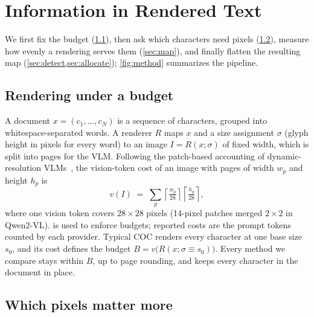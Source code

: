 

\section{Information in Rendered Text}
\label{sec:method}

We first fix the budget (\cref{sec:formulation}), then ask which characters need pixels (\cref{sec:principle}), measure how evenly a rendering serves them (\cref{sec:map}), and finally flatten the resulting map (\cref{sec:detect,sec:allocate}); \cref{fig:method} summarizes the pipeline.

\subsection{Rendering under a budget}
\label{sec:formulation}

A document $x=(c_1,\dots,c_N)$ is a sequence of characters, grouped into whitespace-separated words.
A renderer $R$ maps $x$ and a size assignment $\sigma$ (glyph height in pixels for every word) to an image $I=R(x;\sigma)$ of fixed width, which is split into pages for the VLM.
Following the patch-based accounting of dynamic-resolution VLMs~\cite{wang2024qwen2vl}, the vision-token cost of an image with pages of width $w_p$ and height $h_p$ is
\begin{equation}
  v(I) \;=\; \sum_{p} \left\lceil \tfrac{w_p}{28} \right\rceil \left\lceil \tfrac{h_p}{28} \right\rceil ,
  \label{eq:vtok}
\end{equation}
where one vision token covers $28\times28$ pixels (14-pixel patches merged $2\times2$ in Qwen2-VL).
 is used to enforce budgets; reported costs are the prompt tokens counted by each provider.
Typical COC renders every character at one base size $s_0$, and its cost defines the budget $B = v\big(R(x;\sigma\equiv s_0)\big)$.
Every method we compare stays within $B$, up to page rounding, and keeps every character in the document in place.

\subsection{Which pixels matter more}
\label{sec:principle}

